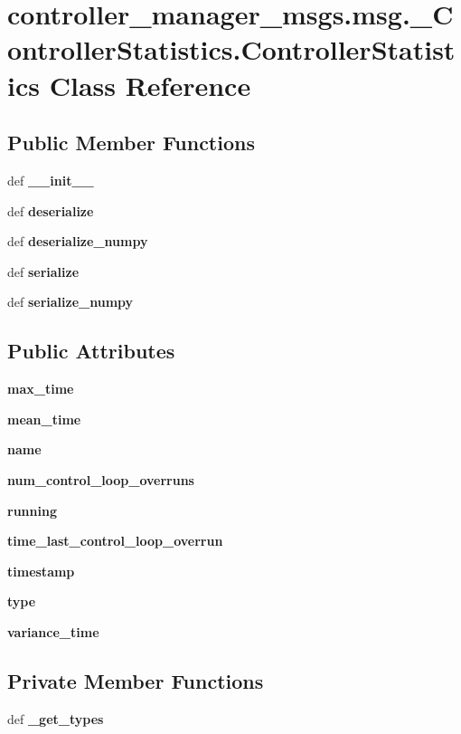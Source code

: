\section{controller\-\_\-manager\-\_\-msgs.\-msg.\-\_\-\-Controller\-Statistics.\-Controller\-Statistics \-Class \-Reference}
\label{classcontroller__manager__msgs_1_1msg_1_1__ControllerStatistics_1_1ControllerStatistics}
\subsection*{\-Public \-Member \-Functions}
\begin{DoxyCompactItemize}
\item 
def {\bf \-\_\-\-\_\-init\-\_\-\-\_\-}
\item 
def {\bf deserialize}
\item 
def {\bf deserialize\-\_\-numpy}
\item 
def {\bf serialize}
\item 
def {\bf serialize\-\_\-numpy}
\end{DoxyCompactItemize}
\subsection*{\-Public \-Attributes}
\begin{DoxyCompactItemize}
\item 
{\bf max\-\_\-time}
\item 
{\bf mean\-\_\-time}
\item 
{\bf name}
\item 
{\bf num\-\_\-control\-\_\-loop\-\_\-overruns}
\item 
{\bf running}
\item 
{\bf time\-\_\-last\-\_\-control\-\_\-loop\-\_\-overrun}
\item 
{\bf timestamp}
\item 
{\bf type}
\item 
{\bf variance\-\_\-time}
\end{DoxyCompactItemize}
\subsection*{\-Private \-Member \-Functions}
\begin{DoxyCompactItemize}
\item 
def {\bf \-\_\-get\-\_\-types}
\end{DoxyCompactItemize}
